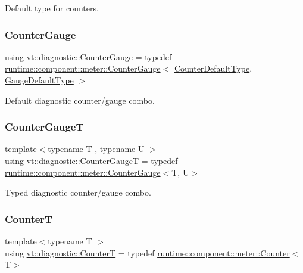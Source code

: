 Default type for counters. 

\mbox{\label{namespacevt_1_1diagnostic_a95e27dc4e2a74cef48e2cf82a3c5cb36}} 
\subsubsection{\texorpdfstring{Counter\+Gauge}{CounterGauge}}
{\footnotesize\ttfamily using \hyperlink{namespacevt_1_1diagnostic_a95e27dc4e2a74cef48e2cf82a3c5cb36}{vt\+::diagnostic\+::\+Counter\+Gauge} = typedef \hyperlink{structvt_1_1runtime_1_1component_1_1meter_1_1_counter_gauge}{runtime\+::component\+::meter\+::\+Counter\+Gauge}$<$ \hyperlink{namespacevt_1_1diagnostic_a23927eac6cae6ec4babd7b8437f163f1}{Counter\+Default\+Type}, \hyperlink{namespacevt_1_1diagnostic_a32500a7e9e4ef4618d0084987ea40a8c}{Gauge\+Default\+Type} $>$}



Default diagnostic counter/gauge combo. 

\mbox{\label{namespacevt_1_1diagnostic_a34a1d8c9a19453bb6b043e3371b7da22}} 
\subsubsection{\texorpdfstring{Counter\+GaugeT}{CounterGaugeT}}
{\footnotesize\ttfamily template$<$typename T , typename U $>$ \\
using \hyperlink{namespacevt_1_1diagnostic_a34a1d8c9a19453bb6b043e3371b7da22}{vt\+::diagnostic\+::\+Counter\+GaugeT} = typedef \hyperlink{structvt_1_1runtime_1_1component_1_1meter_1_1_counter_gauge}{runtime\+::component\+::meter\+::\+Counter\+Gauge}$<$T, U$>$}



Typed diagnostic counter/gauge combo. 

\mbox{\label{namespacevt_1_1diagnostic_a34a84a0f18c25d9e30de69b4b6621ee2}} 
\subsubsection{\texorpdfstring{CounterT}{CounterT}}
{\footnotesize\ttfamily template$<$typename T $>$ \\
using \hyperlink{namespacevt_1_1diagnostic_a34a84a0f18c25d9e30de69b4b6621ee2}{vt\+::diagnostic\+::\+CounterT} = typedef \hyperlink{structvt_1_1runtime_1_1component_1_1meter_1_1_counter}{runtime\+::component\+::meter\+::\+Counter}$<$T$>$}



